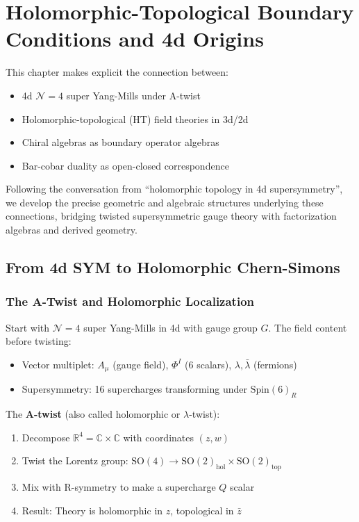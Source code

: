 \chapter{Holomorphic-Topological Boundary Conditions and 4d Origins}
\label{ch:ht-boundary}

\begin{remark}
This chapter makes explicit the connection between:
\begin{itemize}
\item 4d $\mathcal{N}=4$ super Yang-Mills under A-twist
\item Holomorphic-topological (HT) field theories in 3d/2d
\item Chiral algebras as boundary operator algebras
\item Bar-cobar duality as open-closed correspondence
\end{itemize}

Following the conversation from ``holomorphic topology in 4d supersymmetry'', we 
develop the precise geometric and algebraic structures underlying these connections, 
bridging twisted supersymmetric gauge theory with factorization algebras and 
derived geometry.
\end{remark}

\section{From 4d SYM to Holomorphic Chern-Simons}

\subsection{The A-Twist and Holomorphic Localization}

\begin{definition}[A-Twisted 4d $\mathcal{N}=4$ SYM]
Start with $\mathcal{N}=4$ super Yang-Mills in 4d with gauge group $G$. The 
field content before twisting:
\begin{itemize}
\item Vector multiplet: $A_\mu$ (gauge field), $\Phi^I$ (6 scalars), $\lambda, 
\bar{\lambda}$ (fermions)
\item Supersymmetry: 16 supercharges transforming under $\text{Spin}(6)_R$
\end{itemize}

The \textbf{A-twist} (also called holomorphic or $\lambda$-twist):
\begin{enumerate}
\item Decompose $\mathbb{R}^4 = \mathbb{C} \times \mathbb{C}$ with coordinates 
$(z, w)$
\item Twist the Lorentz group: $\text{SO}(4) \to \text{SO}(2)_{\text{hol}} \times 
\text{SO}(2)_{\text{top}}$
\item Mix with R-symmetry to make a supercharge $Q$ scalar
\item Result: Theory is holomorphic in $z$, topological in $\bar{z}$
\end{enumerate}
\end{definition}

